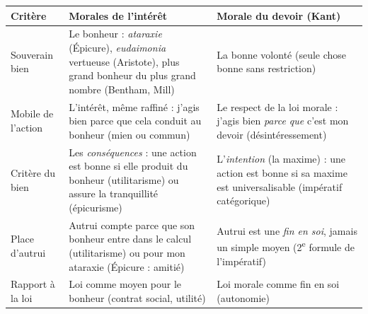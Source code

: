 \documentclass[11pt]{article}
\begin{document}
\begin{center}
\begin{tabularx}{\linewidth}{|l|X|X|}
\hline
\rowcolor{popblueL} \textbf{Critère} & \textbf{Morales de l'intérêt} & \textbf{Morale du devoir (Kant)} \\
\hline
Souverain bien & Le bonheur : \emph{ataraxie} (Épicure), \emph{eudaimonia} vertueuse (Aristote), plus grand bonheur du plus grand nombre (Bentham, Mill) & La bonne volonté (seule chose bonne sans restriction) \\
\hline
Mobile de l'action & L'intérêt, même raffiné : j'agis bien parce que cela conduit au bonheur (mien ou commun) & Le respect de la loi morale : j'agis bien \emph{parce que} c'est mon devoir (désintéressement) \\
\hline
Critère du bien & Les \emph{conséquences} : une action est bonne si elle produit du bonheur (utilitarisme) ou assure la tranquillité (épicurisme) & L'\emph{intention} (la maxime) : une action est bonne si sa maxime est universalisable (impératif catégorique) \\
\hline
Place d'autrui & Autrui compte parce que son bonheur entre dans le calcul (utilitarisme) ou pour mon ataraxie (Épicure : amitié) & Autrui est une \emph{fin en soi}, jamais un simple moyen (2\textsuperscript{e} formule de l'impératif) \\
\hline
Rapport à la loi & Loi comme moyen pour le bonheur (contrat social, utilité) & Loi morale comme fin en soi (autonomie) \\
\hline
\end{tabularx}
\end{center}
\end{document}
